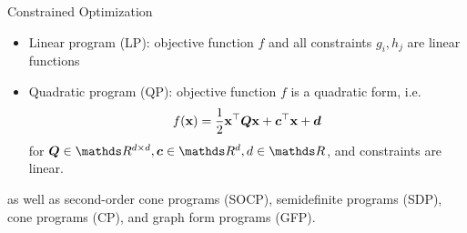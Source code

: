 \documentclass[11pt,compress,t,notes=noshow, xcolor=table]{beamer}
\begin{document}
\begin{vbframe}{Constrained Optimization}
\lz 

\begin{itemize}
	\item Linear program (LP): objective function $f$ and all constraints $g_i, h_j$ are linear functions
	\item Quadratic program (QP): objective function $f$ is a quadratic form, i.e. $$
	f(\mathbf{x}) = \frac{1}{2}\mathbf{x}^\top \bm{Q} \mathbf{x} + \bm{c}^\top \mathbf{x} + \bm{d} 
$$
for $\bm{Q} \in \R^{d \times d}, \bm{c} \in \R^d, d \in \R$, and constraints are linear.
\end{itemize}

as well as second-order cone programs (SOCP), semidefinite programs (SDP), cone programs (CP), and graph form programs (GFP). 

\end{vbframe}

\endlecture
\end{document}
